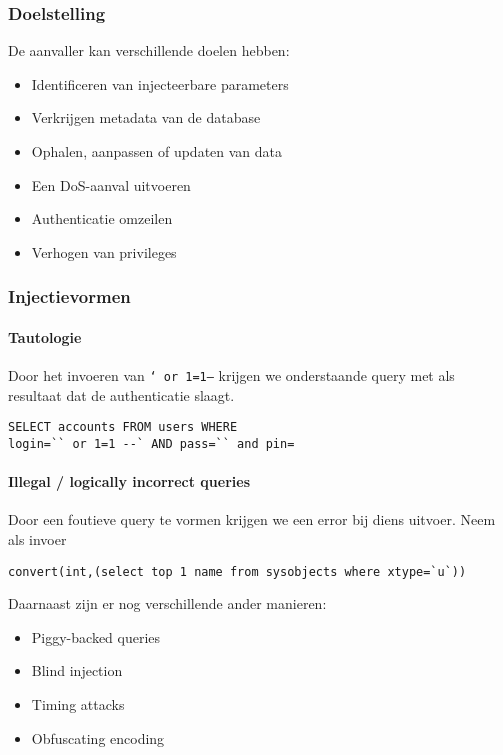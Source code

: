 \documentclass[../main.tex]{subfiles}
\begin{document}
\subsubsection{Doelstelling}
De aanvaller kan verschillende doelen hebben:
\begin{multicols}{2}
\begin{itemize}
	\item Identificeren van injecteerbare parameters
	\item Verkrijgen metadata van de database
	\item Ophalen, aanpassen of updaten van data
	\item Een DoS-aanval uitvoeren
	\item Authenticatie omzeilen
	\item Verhogen van privileges
\end{itemize}
\end{multicols}

\subsubsection{Injectievormen}

\paragraph{Tautologie} Door het invoeren van \texttt{` or 1=1--} krijgen we onderstaande query met als resultaat dat de authenticatie slaagt.
\begin{lstlisting}[caption=Tautologie]
SELECT accounts FROM users WHERE
login=`` or 1=1 --` AND pass=`` and pin=
\end{lstlisting}

\paragraph{Illegal / logically incorrect queries} Door een foutieve query te vormen krijgen we een error bij diens uitvoer. Neem als invoer
\begin{lstlisting}[caption=Illegal input]
convert(int,(select top 1 name from sysobjects where xtype=`u`))
\end{lstlisting}
\noindent
Daarnaast zijn er nog verschillende ander manieren:
\begin{multicols}{2}
\begin{itemize}
	\item Piggy-backed queries
	\item Blind injection
	\item Timing attacks
	\item Obfuscating encoding
\end{itemize}
\end{multicols}
\end{document}
